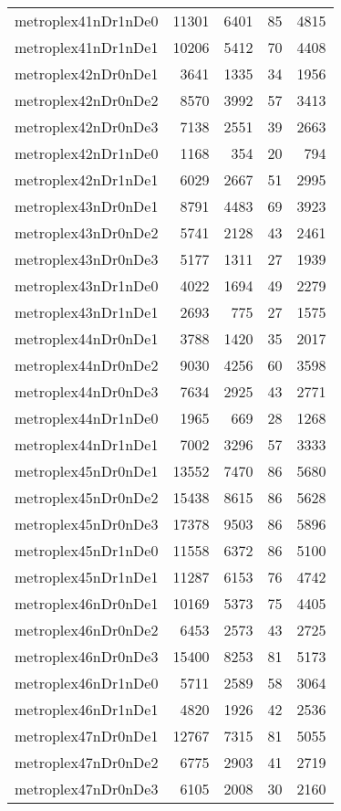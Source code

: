 \begin{longtable}{lrrrr}
metroplex41nDr1nDe0 & 11301 & 6401 & 85 & 4815 \\
metroplex41nDr1nDe1 & 10206 & 5412 & 70 & 4408 \\
metroplex42nDr0nDe1 & 3641 & 1335 & 34 & 1956 \\
metroplex42nDr0nDe2 & 8570 & 3992 & 57 & 3413 \\
metroplex42nDr0nDe3 & 7138 & 2551 & 39 & 2663 \\
metroplex42nDr1nDe0 & 1168 & 354 & 20 & 794 \\
metroplex42nDr1nDe1 & 6029 & 2667 & 51 & 2995 \\
metroplex43nDr0nDe1 & 8791 & 4483 & 69 & 3923 \\
metroplex43nDr0nDe2 & 5741 & 2128 & 43 & 2461 \\
metroplex43nDr0nDe3 & 5177 & 1311 & 27 & 1939 \\
metroplex43nDr1nDe0 & 4022 & 1694 & 49 & 2279 \\
metroplex43nDr1nDe1 & 2693 & 775 & 27 & 1575 \\
metroplex44nDr0nDe1 & 3788 & 1420 & 35 & 2017 \\
metroplex44nDr0nDe2 & 9030 & 4256 & 60 & 3598 \\
metroplex44nDr0nDe3 & 7634 & 2925 & 43 & 2771 \\
metroplex44nDr1nDe0 & 1965 & 669 & 28 & 1268 \\
metroplex44nDr1nDe1 & 7002 & 3296 & 57 & 3333 \\
metroplex45nDr0nDe1 & 13552 & 7470 & 86 & 5680 \\
metroplex45nDr0nDe2 & 15438 & 8615 & 86 & 5628 \\
metroplex45nDr0nDe3 & 17378 & 9503 & 86 & 5896 \\
metroplex45nDr1nDe0 & 11558 & 6372 & 86 & 5100 \\
metroplex45nDr1nDe1 & 11287 & 6153 & 76 & 4742 \\
metroplex46nDr0nDe1 & 10169 & 5373 & 75 & 4405 \\
metroplex46nDr0nDe2 & 6453 & 2573 & 43 & 2725 \\
metroplex46nDr0nDe3 & 15400 & 8253 & 81 & 5173 \\
metroplex46nDr1nDe0 & 5711 & 2589 & 58 & 3064 \\
metroplex46nDr1nDe1 & 4820 & 1926 & 42 & 2536 \\
metroplex47nDr0nDe1 & 12767 & 7315 & 81 & 5055 \\
metroplex47nDr0nDe2 & 6775 & 2903 & 41 & 2719 \\
metroplex47nDr0nDe3 & 6105 & 2008 & 30 & 2160 \\

\end{longtable}
